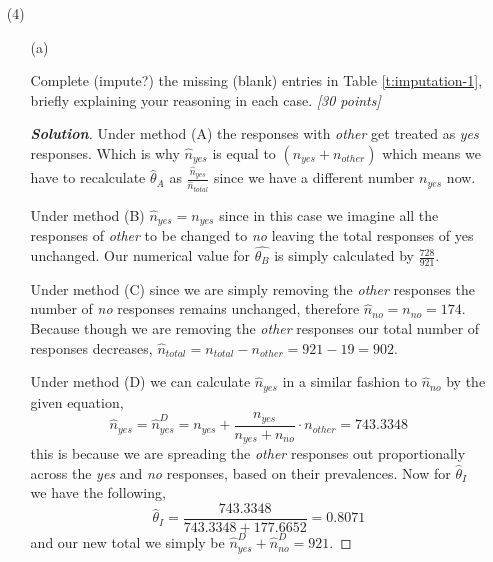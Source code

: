 \documentclass[12pt]{article}
\newenvironment{solution}{\begin{proof}[\textbf{\textit{Solution}}] }{\end{proof}}
\begin{document}
\begin{itemize}
\begin{table}[t!]
\begin{tabular}{c||ccccc||cc}
\end{tabular}

\end{table}
\newpage
\item[(4)]

\begin{itemize}

\item[(a)]

Complete (impute?) the missing (blank) entries in Table \ref{t:imputation-1}, briefly explaining your reasoning in each case. \textit{[30 points]}

\begin{tcolorbox}
    \begin{solution}
         Under method (A) the responses with \textit{other} get treated as \textit{yes} responses. Which is why $\hat{n}_{yes}$ is equal to $(n_{yes} + n_{other})$ which means we have to recalculate $\hat{\theta}_{A}$ as $\frac{\hat{n}_{yes}}{\hat{n}_{total}}$ since we have a different number $n_{yes}$ now. 
        
         Under method (B) $\hat{n}_{yes} = n_{yes}$ since in this case we imagine all the responses of \textit{other} to be changed to \textit{no} leaving the total responses of yes unchanged. Our numerical value for $\hat{\theta_B}$ is simply calculated by $\frac{728}{921}$.
         
         Under method (C) since we are simply removing the \textit{other} responses the number of \textit{no} responses remains unchanged, therefore $\hat{n}_{no} = n_{no}  = 174$. Because though we are removing the \textit{other} responses our total number of responses decreases, $\hat{n}_{total} = n_{total} - n_{other} = 921 - 19 = 902$. 

         Under method (D) we can calculate $\hat{n}_{yes}$ in a similar fashion to $\hat{n}_{no}$ by the given equation,
         \[\hat{n}_{yes} = \hat{n}_{yes}^{D} = n_{yes} + \frac{n_{yes}}{n_{yes} + n_{no}} \cdot n_{other} = 743.3348 \]
        this is because we are spreading the \textit{other} responses out proportionally across the \textit{yes} and \textit{no} responses, based on their prevalences. 
        Now for $\hat{\theta}_I$ we have the following,
        \[\hat{\theta}_I = \frac{743.3348}{743.3348 + 177.6652} = 0.8071 \]
        and our new total we simply be $\hat{n}_{yes}^{D} + \hat{n}_{no}^{D} = 921.$
    \end{solution}
\end{tcolorbox}
\vspace*{0.5in}


\end{itemize}
\end{itemize}
\end{document}
